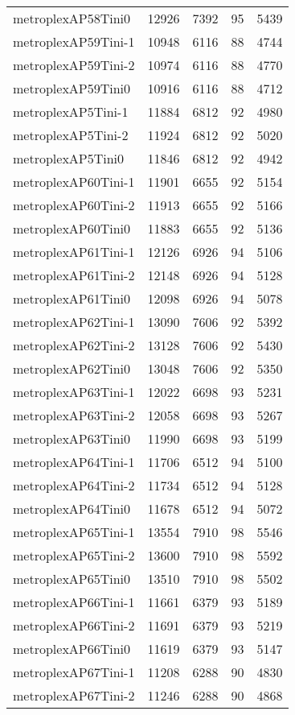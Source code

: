 \documentclass[../../../thesis.tex]{subfiles}
\begin{document}
\begin{longtable}{lrrrr}
metroplexAP58Tini0 & 12926 & 7392 & 95 & 5439 \\
metroplexAP59Tini-1 & 10948 & 6116 & 88 & 4744 \\
metroplexAP59Tini-2 & 10974 & 6116 & 88 & 4770 \\
metroplexAP59Tini0 & 10916 & 6116 & 88 & 4712 \\
metroplexAP5Tini-1 & 11884 & 6812 & 92 & 4980 \\
metroplexAP5Tini-2 & 11924 & 6812 & 92 & 5020 \\
metroplexAP5Tini0 & 11846 & 6812 & 92 & 4942 \\
metroplexAP60Tini-1 & 11901 & 6655 & 92 & 5154 \\
metroplexAP60Tini-2 & 11913 & 6655 & 92 & 5166 \\
metroplexAP60Tini0 & 11883 & 6655 & 92 & 5136 \\
metroplexAP61Tini-1 & 12126 & 6926 & 94 & 5106 \\
metroplexAP61Tini-2 & 12148 & 6926 & 94 & 5128 \\
metroplexAP61Tini0 & 12098 & 6926 & 94 & 5078 \\
metroplexAP62Tini-1 & 13090 & 7606 & 92 & 5392 \\
metroplexAP62Tini-2 & 13128 & 7606 & 92 & 5430 \\
metroplexAP62Tini0 & 13048 & 7606 & 92 & 5350 \\
metroplexAP63Tini-1 & 12022 & 6698 & 93 & 5231 \\
metroplexAP63Tini-2 & 12058 & 6698 & 93 & 5267 \\
metroplexAP63Tini0 & 11990 & 6698 & 93 & 5199 \\
metroplexAP64Tini-1 & 11706 & 6512 & 94 & 5100 \\
metroplexAP64Tini-2 & 11734 & 6512 & 94 & 5128 \\
metroplexAP64Tini0 & 11678 & 6512 & 94 & 5072 \\
metroplexAP65Tini-1 & 13554 & 7910 & 98 & 5546 \\
metroplexAP65Tini-2 & 13600 & 7910 & 98 & 5592 \\
metroplexAP65Tini0 & 13510 & 7910 & 98 & 5502 \\
metroplexAP66Tini-1 & 11661 & 6379 & 93 & 5189 \\
metroplexAP66Tini-2 & 11691 & 6379 & 93 & 5219 \\
metroplexAP66Tini0 & 11619 & 6379 & 93 & 5147 \\
metroplexAP67Tini-1 & 11208 & 6288 & 90 & 4830 \\
metroplexAP67Tini-2 & 11246 & 6288 & 90 & 4868 \\

\end{longtable}
\end{document}
